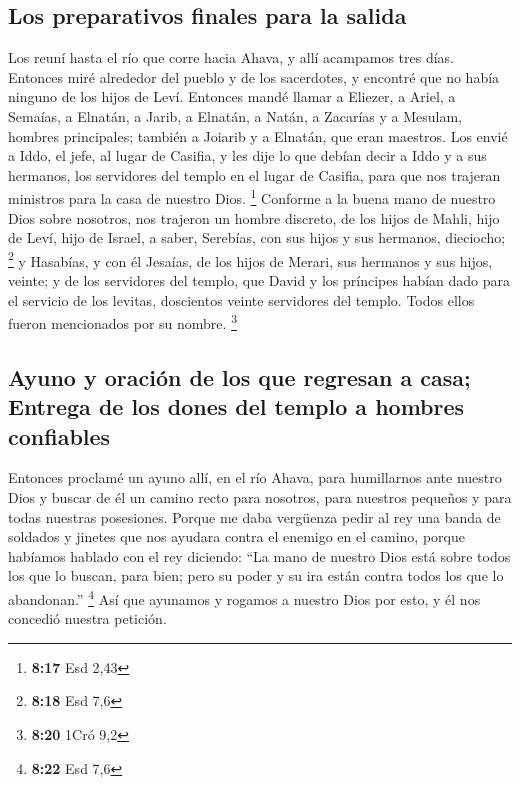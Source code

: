 \hypertarget{los-preparativos-finales-para-la-salida}{%
\subsection{Los preparativos finales para la
salida}\label{los-preparativos-finales-para-la-salida}}

 Los reuní hasta el río que corre hacia Ahava, y allí
acampamos tres días. Entonces miré alrededor del pueblo y de los
sacerdotes, y encontré que no había ninguno de los hijos de Leví.
 Entonces mandé llamar a Eliezer, a Ariel, a Semaías, a
Elnatán, a Jarib, a Elnatán, a Natán, a Zacarías y a Mesulam, hombres
principales; también a Joiarib y a Elnatán, que eran maestros.
 Los envié a Iddo, el jefe, al lugar de Casifia, y les
dije lo que debían decir a Iddo y a sus hermanos, los servidores del
templo en el lugar de Casifia, para que nos trajeran ministros para la
casa de nuestro Dios. \footnote{\textbf{8:17} Esd 2,43} 
Conforme a la buena mano de nuestro Dios sobre nosotros, nos trajeron un
hombre discreto, de los hijos de Mahli, hijo de Leví, hijo de Israel, a
saber, Serebías, con sus hijos y sus hermanos, dieciocho; \footnote{\textbf{8:18}
  Esd 7,6}  y Hasabías, y con él Jesaías, de los hijos de
Merari, sus hermanos y sus hijos, veinte;  y de los
servidores del templo, que David y los príncipes habían dado para el
servicio de los levitas, doscientos veinte servidores del templo. Todos
ellos fueron mencionados por su nombre. \footnote{\textbf{8:20} 1Cró 9,2}

\hypertarget{ayuno-y-oraciuxf3n-de-los-que-regresan-a-casa-entrega-de-los-dones-del-templo-a-hombres-confiables}{%
\subsection{Ayuno y oración de los que regresan a casa; Entrega de los
dones del templo a hombres
confiables}\label{ayuno-y-oraciuxf3n-de-los-que-regresan-a-casa-entrega-de-los-dones-del-templo-a-hombres-confiables}}

 Entonces proclamé un ayuno allí, en el río Ahava, para
humillarnos ante nuestro Dios y buscar de él un camino recto para
nosotros, para nuestros pequeños y para todas nuestras posesiones.
 Porque me daba vergüenza pedir al rey una banda de
soldados y jinetes que nos ayudara contra el enemigo en el camino,
porque habíamos hablado con el rey diciendo: ``La mano de nuestro Dios
está sobre todos los que lo buscan, para bien; pero su poder y su ira
están contra todos los que lo abandonan.'' \footnote{\textbf{8:22} Esd
  7,6}  Así que ayunamos y rogamos a nuestro Dios por
esto, y él nos concedió nuestra petición.

